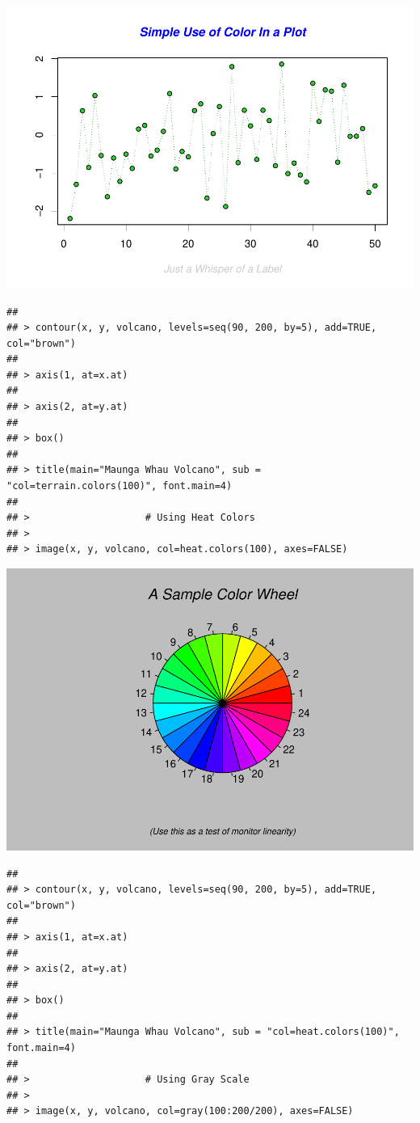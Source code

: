 \documentclass[
]{book}
\begin{document}
\includegraphics{TudodoR_files/figure-latex/unnamed-chunk-147-1.pdf}

\begin{verbatim}
## 
## > contour(x, y, volcano, levels=seq(90, 200, by=5), add=TRUE, col="brown")
## 
## > axis(1, at=x.at)
## 
## > axis(2, at=y.at)
## 
## > box()
## 
## > title(main="Maunga Whau Volcano", sub = "col=terrain.colors(100)", font.main=4)
## 
## >                    # Using Heat Colors
## > 
## > image(x, y, volcano, col=heat.colors(100), axes=FALSE)
\end{verbatim}

\includegraphics{TudodoR_files/figure-latex/unnamed-chunk-147-2.pdf}

\begin{verbatim}
## 
## > contour(x, y, volcano, levels=seq(90, 200, by=5), add=TRUE, col="brown")
## 
## > axis(1, at=x.at)
## 
## > axis(2, at=y.at)
## 
## > box()
## 
## > title(main="Maunga Whau Volcano", sub = "col=heat.colors(100)", font.main=4)
## 
## >                    # Using Gray Scale
## > 
## > image(x, y, volcano, col=gray(100:200/200), axes=FALSE)
\end{verbatim}
\end{document}
